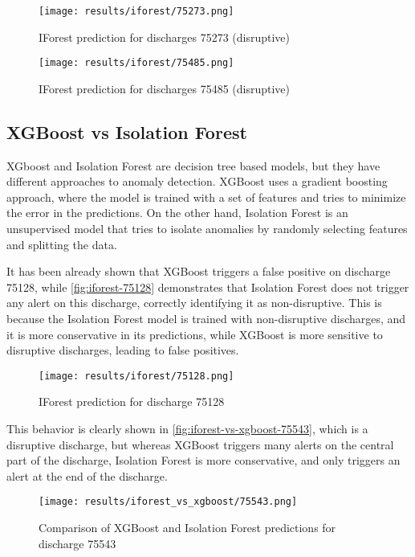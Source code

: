 \begin{figure}[H]
    \centering
    \texttt{[image: results/iforest/75273.png]}
    \caption{\ac{IForest} prediction for discharges 75273 (disruptive)}
    \label{fig:iforest-75273}
\end{figure}

\begin{figure}[H]
    \centering
    \texttt{[image: results/iforest/75485.png]}
    \caption{\ac{IForest} prediction for discharges 75485 (disruptive)}
    \label{fig:iforest-75485}
\end{figure}

\subsection{XGBoost vs Isolation Forest}

XGboost and Isolation Forest are decision tree based models, but they have different approaches to anomaly detection. XGBoost uses a gradient boosting approach, where the model is trained with a set of features and tries to minimize the error in the predictions. On the other hand, Isolation Forest is an unsupervised model that tries to isolate anomalies by randomly selecting features and splitting the data.

It has been already shown that XGBoost triggers a false positive on discharge 75128, while \autoref{fig:iforest-75128} demonstrates that Isolation Forest does not trigger any alert on this discharge, correctly identifying it as non-disruptive. This is because the Isolation Forest model is trained with non-disruptive discharges, and it is more conservative in its predictions, while XGBoost is more sensitive to disruptive discharges, leading to false positives. 

\begin{figure}[H]
    \centering
    \texttt{[image: results/iforest/75128.png]}
    \caption{\ac{IForest} prediction for discharge 75128}
    \label{fig:iforest-75128}
\end{figure}

This behavior is clearly shown in \autoref{fig:iforest-vs-xgboost-75543}, which is a disruptive discharge, but whereas XGBoost triggers many alerts on the central part of the discharge, Isolation Forest is more conservative, and only triggers an alert at the end of the discharge.

\begin{figure}[H]
    \centering
    \texttt{[image: results/iforest\_vs\_xgboost/75543.png]}
    \caption{Comparison of XGBoost and Isolation Forest predictions for discharge 75543}
    \label{fig:iforest-vs-xgboost-75543}
\end{figure}

